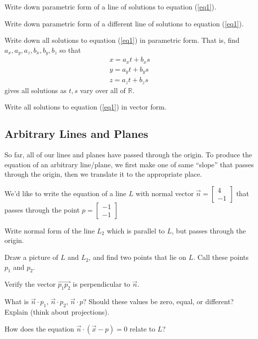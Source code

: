 \documentclass{article}
\newcommand{\R}{\mathbb{R}}
\newcommand{\mat}[1]{\begin{bmatrix}#1\end{bmatrix}}
\begin{document}
	\begin{Enum}[resume]
		\item Write down parametric form of a line of solutions to equation (\ref{eq1}).
		\item Write down parametric form of a different line of solutions to equation (\ref{eq1}).
		\item Write down all solutions to equation (\ref{eq1}) in parametric form.  That is, find $a_x,
		a_y,a_z,b_x,b_y,b_z$ so that
		\[
			\begin{array}{l}
				x=a_x t+b_x s\\
				y=a_y t+b_y s\\
				z=a_z t+b_z s
			\end{array}
		\]
		gives all solutions as $t,s$ vary over all of $\R$.
		\item Write all solutions to equation (\ref{eq1}) in vector form.
	\end{Enum}

\subsection*{Arbitrary Lines and Planes}
	
	So far, all of our lines and planes have passed through the origin. To 
	produce the equation of an arbitrary line/plane, we first make one of
	same ``slope'' that passes through the origin, then we translate it
	to the appropriate place.

	We'd like to write the equation of a line $L$ with normal vector
	$\vec n=\begin{bmatrix}4\\-1\end{bmatrix}$ that passes through
	the point $p=\mat{-1\\-1}$

	\begin{Enum}
		\item Write normal form of the line $L_2$ which is parallel to $L$,
		but passes through the origin.
		\item Draw a picture of $L$ and $L_2$, and find two points that lie on
		$L$.  Call these points $p_1$ and $p_2$.
		\item Verify the vector $\vec {p_1p_2}$ is perpendicular to $\vec n$.
		\item What is $\vec n\cdot p_1$, $\vec n\cdot p_2$, $\vec n\cdot p$?
		Should these values be zero, equal, or different?  Explain (think about
		projections).
		\item How does the equation $\vec n\cdot (\vec x-p)=0$ relate to $L$?
	\end{Enum}
\end{document}
